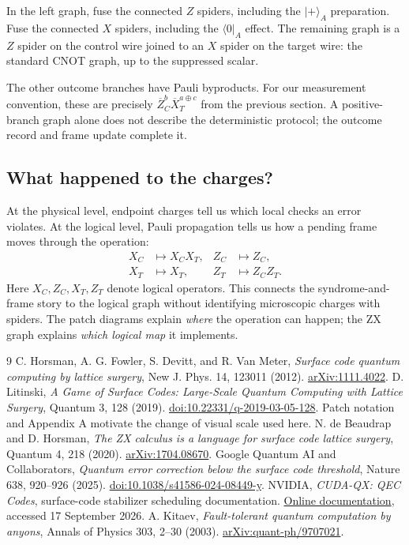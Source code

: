 \documentclass[11pt,a4paper]{article}
\newcommand{\ket}[1]{\lvert #1\rangle}
\newcommand{\bra}[1]{\langle #1\rvert}
\newcommand{\XL}{\overline{X}}
\newcommand{\ZL}{\overline{Z}}
\begin{document}
In the left graph, fuse the connected $Z$ spiders, including the $\ket{+}_A$ preparation. Fuse the connected $X$ spiders, including the $\bra{0}_A$ effect. The remaining graph is a $Z$ spider on the control wire joined to an $X$ spider on the target wire: the standard CNOT graph, up to the suppressed scalar.

The other outcome branches have Pauli byproducts. For our measurement convention, these are precisely $\ZL_C^b\XL_T^{a\oplus c}$ from the previous section. A positive-branch graph alone does not describe the deterministic protocol; the outcome record and frame update complete it.

\subsection*{What happened to the charges?}
At the physical level, endpoint charges tell us which local checks an error violates. At the logical level, Pauli propagation tells us how a pending frame moves through the operation:
\[
\begin{aligned}
X_C&\longmapsto X_CX_T, & Z_C&\longmapsto Z_C,\\
X_T&\longmapsto X_T, & Z_T&\longmapsto Z_CZ_T.
\end{aligned}
\]
Here $X_C,Z_C,X_T,Z_T$ denote logical operators. This connects the syndrome-and-frame story to the logical graph without identifying microscopic charges with spiders. The patch diagrams explain \emph{where} the operation can happen; the ZX graph explains \emph{which logical map} it implements.

\newpage
\begin{thebibliography}{9}
 C. Horsman, A. G. Fowler, S. Devitt, and R. Van Meter, \emph{Surface code quantum computing by lattice surgery}, New J. Phys. 14, 123011 (2012). \href{https://arxiv.org/abs/1111.4022}{arXiv:1111.4022}.
 D. Litinski, \emph{A Game of Surface Codes: Large-Scale Quantum Computing with Lattice Surgery}, Quantum 3, 128 (2019). \href{https://quantum-journal.org/papers/q-2019-03-05-128/}{doi:10.22331/q-2019-03-05-128}. Patch notation and Appendix A motivate the change of visual scale used here.
 N. de Beaudrap and D. Horsman, \emph{The ZX calculus is a language for surface code lattice surgery}, Quantum 4, 218 (2020). \href{https://arxiv.org/abs/1704.08670}{arXiv:1704.08670}.
 Google Quantum AI and Collaborators, \emph{Quantum error correction below the surface code threshold}, Nature 638, 920--926 (2025). \href{https://doi.org/10.1038/s41586-024-08449-y}{doi:10.1038/s41586-024-08449-y}.
 NVIDIA, \emph{CUDA-QX: QEC Codes}, surface-code stabilizer scheduling documentation. \href{https://nvidia.github.io/cudaqx/components/qec/codes.html}{Online documentation}, accessed 17 September 2026.
 A. Kitaev, \emph{Fault-tolerant quantum computation by anyons}, Annals of Physics 303, 2--30 (2003). \href{https://arxiv.org/abs/quant-ph/9707021}{arXiv:quant-ph/9707021}.
\end{thebibliography}
\end{document}
